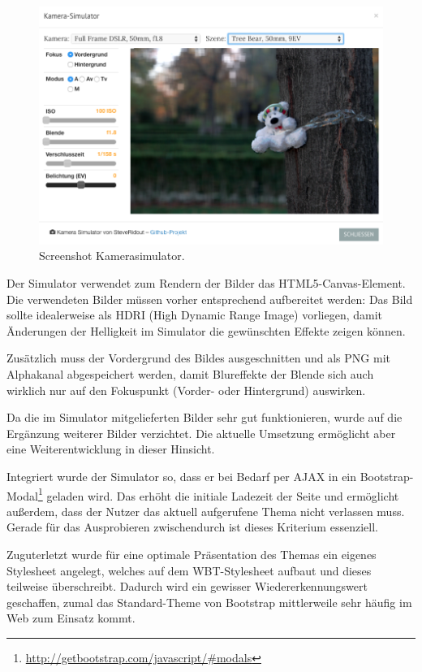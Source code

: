\documentclass{article}
\begin{document}
\begin{figure}[htb]
\begin{minipage}[b]{1.0\linewidth}
  \centering
\centerline{\includegraphics[width=\linewidth]{kamerasimulator.png}}
\end{minipage}
\caption{Screenshot Kamerasimulator.}
\label{fig:res}
\end{figure}


Der Simulator verwendet zum Rendern der Bilder das HTML5-Canvas-Element. 
Die verwendeten Bilder m\"ussen vorher entsprechend aufbereitet werden: Das Bild sollte idealerweise als HDRI (High Dynamic Range Image) vorliegen, damit \"Anderungen der Helligkeit im Simulator die gew\"unschten Effekte zeigen k\"onnen. 

Zus\"atzlich muss der Vordergrund des Bildes ausgeschnitten und als PNG mit Alphakanal abgespeichert werden, damit Blureffekte der Blende sich auch wirklich nur auf den Fokuspunkt (Vorder- oder Hintergrund) auswirken.

Da die im Simulator mitgelieferten Bilder sehr gut funktionieren, wurde auf die Erg\"anzung weiterer Bilder verzichtet. Die aktuelle Umsetzung erm\"oglicht aber eine Weiterentwicklung in dieser Hinsicht.

Integriert wurde der Simulator so, dass er bei Bedarf per AJAX in ein Bootstrap-Modal\footnote{\url{http://getbootstrap.com/javascript/\#modals}} geladen wird. Das erh\"oht die initiale Ladezeit der Seite und erm\"oglicht au{\ss}erdem, dass der Nutzer das aktuell aufgerufene Thema nicht verlassen muss. Gerade f\"ur das Ausprobieren zwischendurch ist dieses Kriterium essenziell.

Zuguterletzt wurde f\"ur eine optimale Pr\"asentation des Themas ein eigenes Stylesheet angelegt, welches auf dem WBT-Stylesheet aufbaut und dieses teilweise \"uberschreibt. Dadurch wird ein gewisser Wiedererkennungswert geschaffen, zumal das Standard-Theme von Bootstrap mittlerweile sehr h\"aufig im Web zum Einsatz kommt. 
\end{document}
